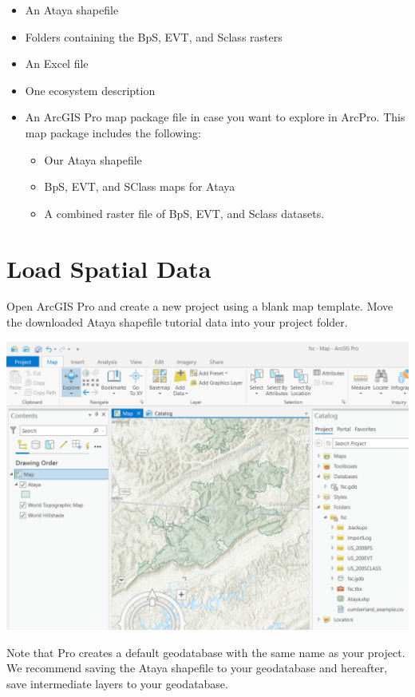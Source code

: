 \documentclass[
]{book}
\providecommand{\tightlist}{%
  \setlength{\itemsep}{0pt}\setlength{\parskip}{0pt}}
\begin{document}
\begin{itemize}
\tightlist
\item
  An Ataya shapefile
\item
  Folders containing the BpS, EVT, and Sclass rasters
\item
  An Excel file
\item
  One ecosystem description
\item
  An ArcGIS Pro map package file in case you want to explore in ArcPro. This map package includes the following:

  \begin{itemize}
  \tightlist
  \item
    Our Ataya shapefile
  \item
    BpS, EVT, and SClass maps for Ataya
  \item
    A combined raster file of BpS, EVT, and Sclass datasets.
  \end{itemize}
\end{itemize}

\hypertarget{load-spatial-data}{%
\section{Load Spatial Data}\label{load-spatial-data}}

Open ArcGIS Pro and create a new project using a blank map template. Move the downloaded Ataya shapefile tutorial data into your project folder.

\includegraphics[width=1000px]{04_gis_screenshots/1_load_data}

Note that Pro creates a default geodatabase with the same name as your project. We recommend saving the Ataya shapefile to your geodatabase and hereafter, save intermediate layers to your geodatabase.
\end{document}
